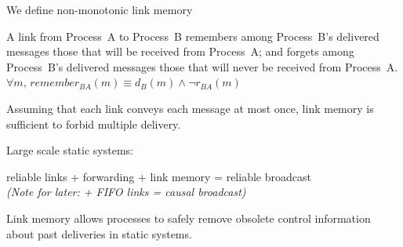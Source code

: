 \documentclass[10pt, xcolor={usenames, dvipsnames}]{beamer}
\newcommand{\cmark}{\ding{51}}
\newcommand{\YES}[1]{\textcolor{green}{#1}}
\begin{document}
\begin{frame}{We define non-monotonic link memory}

  \begin{definition}
    A link from Process~A to Process~B remembers among Process~B's delivered
    messages those that will be received from Process~A; and forgets among
    Process~B's delivered messages those that will never be received from
    Process~A.\\
    $\forall m,\, remember_{BA}(m) \equiv d_B(m) \wedge \neg r_{BA}(m)$
  \end{definition}

  \vspace{2em}

  \begin{theorem}
    Assuming that each link conveys each message at most once, link memory is
    sufficient to forbid multiple delivery.
  \end{theorem}

\end{frame}


\begin{frame}{Large scale static systems: \YES{\cmark}}
  
  reliable links + forwarding + link memory = reliable broadcast\\
  \textit{(Note for later: + FIFO links = causal broadcast)}


  \begin{minipage}{0.24\textwidth}
    \centering
        
  \end{minipage}
  \begin{minipage}{0.24\textwidth}
    \vspace{11pt}
    \centering
        
  \end{minipage}
  \begin{minipage}{0.24\textwidth}
    \vspace{11pt}
    \centering
        
  \end{minipage}
  \begin{minipage}{0.24\textwidth}
    \vspace{1pt}
    \centering
    
  \end{minipage}

  \vspace{2em}

  Link memory allows processes to safely remove obsolete control information
  about past deliveries in static systems. 

\end{frame}
\end{document}
